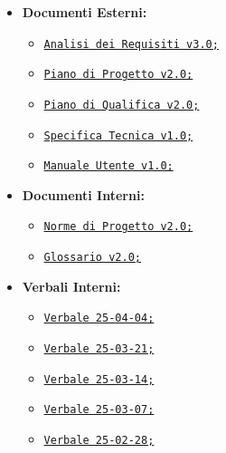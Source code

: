 \documentclass{article}
\begin{document}
\begin{itemize}
     \item \textbf{Documenti Esterni:}
        \begin{itemize}
            \item \href{https://code7crusaders.github.io/docs/PB/documentazione_esterna/analisi_dei_requisiti.html}{\texttt{Analisi dei Requisiti v3.0;}}
            \item \href{https://code7crusaders.github.io/docs/PB/documentazione_esterna/piano_di_progetto.html}{\texttt{Piano di Progetto v2.0;}}
            \item \href{https://code7crusaders.github.io/docs/PB/documentazione_esterna/piano_di_qualifica.html}{\texttt{Piano di Qualifica v2.0;}}
            \item \href{https://code7crusaders.github.io/docs/PB/documentazione_esterna/specifica_tecnica.html}{\texttt{Specifica Tecnica v1.0;}}
            \item \href{https://code7crusaders.github.io/docs/PB/documentazione_esterna/manuale_utente.html}{\texttt{Manuale Utente v1.0;}}
        \end{itemize}
        \item \textbf{Documenti Interni:}
        \begin{itemize}
            \item \href{https://code7crusaders.github.io/docs/PB/documentazione_interna/norme_di_progetto.html}{\texttt{Norme di Progetto v2.0;}}
            \item \href{https://code7crusaders.github.io/docs/PB/documentazione_interna/glossario.html}{\texttt{Glossario v2.0;}}
        \end{itemize}
        \item \textbf{Verbali Interni:}
        \begin{itemize}
            \item \href{https://code7crusaders.github.io/docs/PB/verbale_interno/verbale_25-04-04.html}{\texttt{Verbale 25-04-04;}}
            \item \href{https://code7crusaders.github.io/docs/PB/verbale_interno/verbale_25-03-21.html}{\texttt{Verbale 25-03-21;}}
            \item \href{https://code7crusaders.github.io/docs/PB/verbale_interno/verbale_25-03-14.html}{\texttt{Verbale 25-03-14;}}
            \item \href{https://code7crusaders.github.io/docs/PB/verbale_interno/verbale_25-03-07.html}{\texttt{Verbale 25-03-07;}}
            \item \href{https://code7crusaders.github.io/docs/PB/verbale_interno/verbale_25-02-28.html}{\texttt{Verbale 25-02-28;}}

\end{itemize}
\end{itemize}
\end{document}

